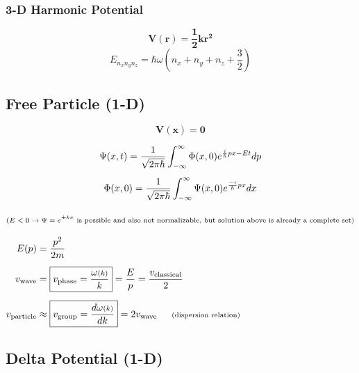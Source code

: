 \documentclass[12pt]{article}
\begin{document}
\vspace{10pt}\noindent
\subsubsection{3-D Harmonic Potential}

\[ \boldsymbol{V(r) = \frac{1}{2} k r^2} \]
\[ \boxed{ E_{n_x n_y n_z} = \hbar \omega \left(n_x + n_y + n_z + \frac{3}{2}\right) } \]

\newpage
\subsection{Free Particle (1-D)}
\[ \boldsymbol{ V(x) = 0 }\]

\vspace{10pt}
\[ \begin{gathered}
    \Psi(x,t) = \frac{1}{\sqrt{2\pi\hbar}} \int_{-\infty}^\infty \Phi(x,0) e^{\frac{i}{\hbar} p x - E t} dp\\[5pt]
    \Phi(x,0) = \frac{1}{\sqrt{2\pi\hbar}} \int_{-\infty}^\infty \Psi(x,0) e^{\frac{-i}{\hbar} p x} dx\\[10pt]
    \text{\scriptsize(\(E<0 \rightarrow \Psi = e^{\pm kx}\) is possible and also not normalizable, 
    but solution above is already a complete set)}
\end{gathered} \]

\vspace{10pt} \noindent
\( \begin{aligned}
    E(p) &= \frac{p^2}{2m}\\[5pt]
    v_\text{wave} &= \boxed{ v_\text{phase} = \frac{ \omega{\scriptstyle(k)} }{k} } 
        = \frac{E}{p} = \frac{v_\text{classical}}{2} \\[5pt]
    v_\text{particle} &\approx \boxed{ v_\text{group} = \frac{d \omega{\scriptstyle(k)} }{d k} } = 2 v_\text{wave}
        \indent \text{\scriptsize (dispersion relation)}
\end{aligned} \)

\vspace{10pt}
\subsection{Delta Potential (1-D)}
\end{document}
